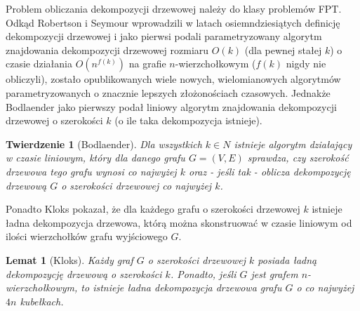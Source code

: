 \documentclass[12pt, oneside]{report}
\newtheorem{theorem}{Twierdzenie}
\newtheorem{lemma}{Lemat}
\newcommand\Omicron{O}
\begin{document}
Problem obliczania dekompozycji drzewowej należy do klasy problemów FPT. Odkąd Robertson i Seymour \cite{robertson&seymour} wprowadzili w latach osiemndziesiątych definicję dekompozycji drzewowej i jako pierwsi podali parametryzowany algorytm znajdowania dekompozycji drzewowej rozmiaru $\Omicron(k)$ (dla pewnej stałej $k$) o czasie działania $\Omicron(n^{f(k)})$ na grafie $n$-wierzchołkowym ($f(k)$ nigdy nie obliczyli), zostało opublikowanych wiele nowych, wielomianowych algorytmów parametryzowanych o znacznie lepszych złożonościach czasowych. Jednakże Bodlaender \cite{bodlaender} jako pierwszy podał liniowy algorytm znajdowania dekompozycji drzewowej o szerokości $k$ (o ile taka dekompozycja istnieje). 

\begin{theorem}[Bodlaender]
Dla wszystkich $k \in N$ istnieje algorytm działający w czasie liniowym, który dla danego grafu $G = (V, E)$ sprawdza, czy szerokość drzewowa tego grafu wynosi co najwyżej $k$ oraz - jeśli tak - oblicza dekompozycję drzewową $G$ o szerokości drzewowej co najwyżej $k$.  
\end{theorem}

Ponadto Kloks \cite{kloks} pokazał, że dla każdego grafu o szerokości drzewowej $k$ istnieje ładna dekompozycja drzewowa, którą można skonstruować w czasie liniowym od ilości wierzchołków grafu wyjściowego $G$.

\begin{lemma}[Kloks]
\label{kloks}
Każdy graf $G$ o szerokości drzewowej $k$ posiada ładną dekompozycję drzewową o szerokości $k$. Ponadto, jeśli $G$ jest grafem $n$-wierzchołkowym, to istnieje ładna dekompozycja drzewowa grafu $G$ o co najwyżej $4n$ kubełkach.
\end{lemma}
\end{document}
